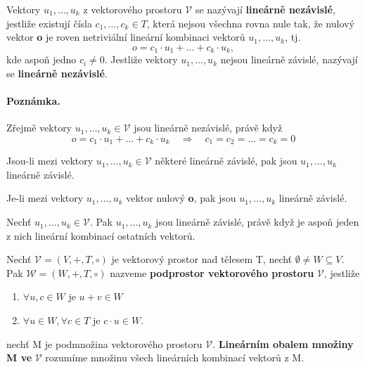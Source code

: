 \begin{definition}
	Vektory $u_1, \dots, u_k$ z vektorového prostoru $\mathscr{V}$ se nazývají \textbf{lineárně nezávislé}, jestliže existují čísla $c_1, \dots, c_k \in T$, která nejsou všechna rovna nule tak, že nulový vektor \textbf{o} je roven netriviální lineární kombinaci vektorů $u_1, \dots, u_k$, tj. $$o = c_1 \cdot u_1 + \dots + c_k \cdot u_k,$$
	kde aspoň jedno $c_i \not= 0$. Jestliže vektory $u_1, \dots, u_k$ nejsou lineárně závislé, nazývají se \textbf{lineárně nezávislé}.
\end{definition}

\paragraph{Poznámka.} Zřejmě vektory  $u_1, \dots, u_k \in \mathscr{V}$ jsou lineárně nezávislé, právě když $$o = c_1 \cdot u_1 +  \dots + c_k \cdot u_k \quad \Rightarrow \quad c_1 = c_2 = \dots = c_k = 0$$

\begin{sentence}
	Jsou-li mezi vektory  $u_1, \dots, u_k \in \mathscr{V}$  některé lineárně závislé, pak jsou  $u_1, \dots, u_k$ lineárně závislé.
\end{sentence}

\begin{sentence}
	Je-li mezi vektory  $u_1, \dots, u_k$  vektor nulový \textbf{o}, pak jsou $u_1, \dots, u_k$ lineárně závislé.
\end{sentence}

\begin{sentence}
	Nechť $u_1, \dots, u_k \in \mathscr{V}$. Pak  $u_1, \dots, u_k$ jsou lineárně závislé, právě když je aspoň jeden z nich lineární kombinací ostatních vektorů.
\end{sentence}

\begin{definition}
	Nechť  $\mathscr{V} = (V, +, T, \circ)$  je vektorový prostor nad tělesem T, nechť $\emptyset \not= W \subseteq V$. Pak  $\mathscr{W} = (W, +, T, \circ)$ nazveme \textbf{podprostor vektorového prostoru} $\mathscr{V}$, jestliže
	\begin{enumerate}
		\item $\forall u,c \in W$ je $u + v \in W$
		\item $\forall u \in W, \forall c \in T$ je $c \cdot u \in W$.
	\end{enumerate}
\end{definition}


\begin{definition}
	nechť M je podmnožina vektorového prostoru $\mathscr{V}$. \textbf{Lineárním obalem množiny M ve} $\mathscr{V}$ rozumíme množinu všech lineárních kombinací vektorů z M.
\end{definition}

